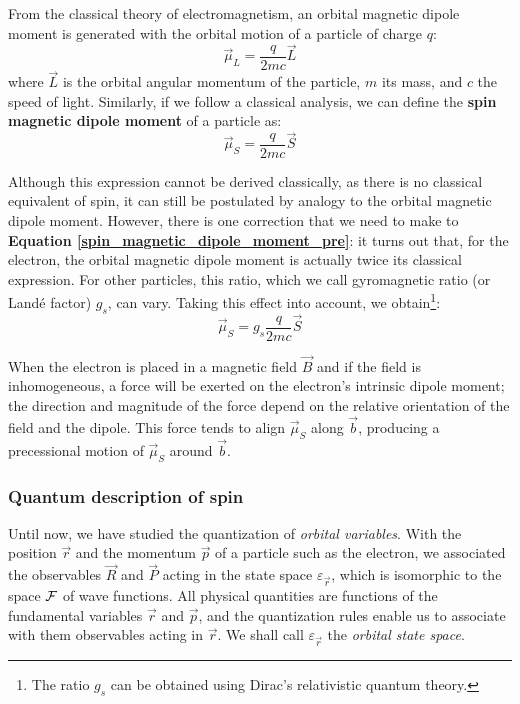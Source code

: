 From the classical theory of electromagnetism, an orbital magnetic dipole moment is generated with the orbital motion of a particle of charge $q$:
\begin{equation}
    \vec{\mu}_L = \frac{q}{2mc}\vec{L}
\end{equation}
where $\vec{L}$ is the orbital angular momentum of the particle, $m$ its mass, and $c$ the speed of light. Similarly, if we follow a classical analysis, we can define the \textbf{spin magnetic dipole moment} of a particle as:
\begin{equation} \label{spin_magnetic_dipole_moment_pre}
    \vec{\mu}_S = \frac{q}{2mc}\vec{S}
\end{equation}

Although this expression cannot be derived classically, as there is no classical equivalent of spin, it can still be postulated by analogy to the orbital magnetic dipole moment. However, there is one correction that we need to make to \textbf{Equation \ref{spin_magnetic_dipole_moment_pre}}: it turns out that, for the electron, the orbital magnetic dipole moment is actually twice its classical expression. For other particles, this ratio, which we call gyromagnetic ratio (or Landé factor) $g_s$, can vary. Taking this effect into account, we obtain\footnote{The ratio $g_s$ can be obtained using Dirac's relativistic quantum theory.}:
\begin{equation}
    \vec{\mu}_S = g_s\frac{q}{2mc}\vec{S}
\end{equation}

When the electron is placed in a magnetic field $\vec{B}$ and if the field is inhomogeneous, a force will be exerted on the electron's intrinsic dipole moment; the direction and magnitude of the force depend on the relative orientation of the field and the dipole. This force tends to align $\vec{\mu}_S$  along $\vec{b}$, producing a precessional motion of $\vec{\mu}_S$ around $\vec{b}$.



\subsubsection{Quantum description of spin}

Until now, we have studied the quantization of \textit{orbital variables}. With the position $\vec{r}$ and the momentum $\vec{p}$ of a particle such as the electron, we associated the observables $\vec{R}$ and $\vec{P}$ acting in the state space $\varepsilon_{\vec{r}}$, which is isomorphic to the space $\mathcal{F}$ of wave functions. All physical quantities are functions of the fundamental variables $\vec{r}$ and $\vec{p}$, and the quantization rules enable us to associate with them observables acting in $\vec{r}$. We shall call $\varepsilon_{\vec{r}}$ the \textit{orbital state space}.

